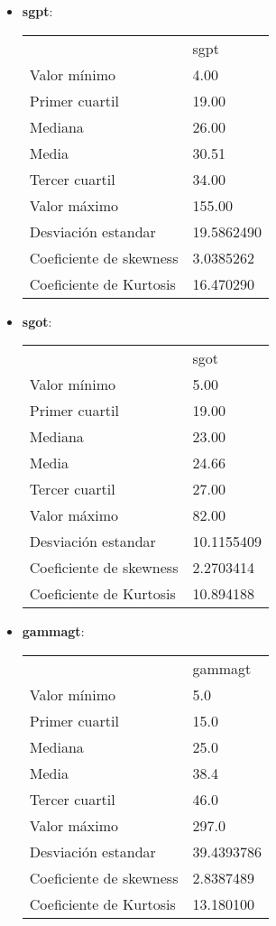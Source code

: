 \begin{itemize}
	
	\item \textbf{sgpt}: 
	\begin{table}[]
		\begin{tabular}{ll}
			& sgpt       \\
			Valor mínimo            & 4.00       \\
			Primer cuartil          & 19.00      \\
			Mediana                 & 26.00      \\
			Media                   & 30.51      \\
			Tercer cuartil          & 34.00      \\
			Valor máximo            & 155.00     \\ \hline
			Desviación estandar     & 19.5862490 \\ \hline
			Coeficiente de skewness & 3.0385262  \\
			Coeficiente de Kurtosis & 16.470290 
		\end{tabular}
	\end{table}
	
	
	\item \textbf{sgot}: 
	\begin{table}[]
		\begin{tabular}{ll}
			& sgot       \\
			Valor mínimo            & 5.00       \\
			Primer cuartil          & 19.00      \\
			Mediana                 & 23.00      \\
			Media                   & 24.66      \\
			Tercer cuartil          & 27.00      \\
			Valor máximo            & 82.00      \\ \hline
			Desviación estandar     & 10.1155409 \\ \hline
			Coeficiente de skewness & 2.2703414  \\
			Coeficiente de Kurtosis & 10.894188 
		\end{tabular}
	\end{table}
	
	
	\item \textbf{gammagt}: 
	\begin{table}[]
		\begin{tabular}{ll}
			& gammagt    \\
			Valor mínimo            & 5.0        \\
			Primer cuartil          & 15.0       \\
			Mediana                 & 25.0       \\
			Media                   & 38.4       \\
			Tercer cuartil          & 46.0       \\
			Valor máximo            & 297.0      \\ \hline
			Desviación estandar     & 39.4393786 \\ \hline
			Coeficiente de skewness & 2.8387489  \\
			Coeficiente de Kurtosis & 13.180100 
		\end{tabular}
	\end{table}
	

\end{itemize}
